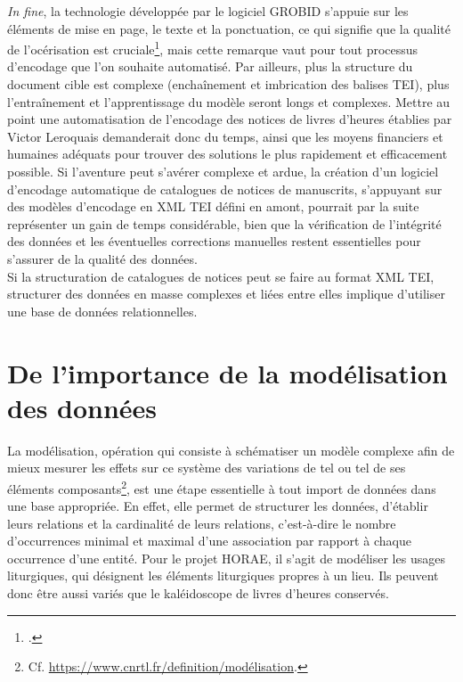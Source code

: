 \documentclass[a4paper,12pt,twoside]{book}
\begin{document}
	\textit{In fine}, la technologie développée par le logiciel GROBID s'appuie sur les éléments de mise en page, le texte et la ponctuation, ce qui signifie que la qualité de l'océrisation est cruciale\footcite[p. 59]{Grobid_catalogues}, mais cette remarque vaut pour tout processus d'encodage que l'on souhaite automatisé. Par ailleurs, plus la structure du document cible est complexe (enchaînement et imbrication des balises TEI), plus l'entraînement et l'apprentissage du modèle seront longs et complexes. Mettre au point une automatisation de l'encodage des notices de livres d'heures établies par Victor Leroquais demanderait donc du temps, ainsi que les moyens financiers et humaines adéquats pour trouver des solutions le plus rapidement et efficacement possible. Si l'aventure peut s'avérer complexe et ardue, la création d'un logiciel d'encodage automatique de catalogues de notices de manuscrits, s'appuyant sur des modèles d'encodage en XML TEI défini en amont, pourrait par la suite représenter un gain de temps considérable, bien que la vérification de l'intégrité des données et les éventuelles corrections manuelles restent essentielles pour s'assurer de la qualité des données. \\
	
	Si la structuration de catalogues de notices peut se faire au format XML TEI, structurer des données en masse complexes et liées entre elles implique d’utiliser une base de données relationnelles. 

	
	\chapter{\label{modelisation}De l’importance de la modélisation des données}
	
	La modélisation, opération qui consiste à schématiser un modèle complexe afin de mieux \og mesurer les effets sur ce système des variations de tel ou tel de ses éléments composants\fg{}\footnote{Cf. \url{https://www.cnrtl.fr/definition/modélisation}.}, est une étape essentielle à tout import de données dans une base appropriée. En effet, elle permet de structurer les données, d'établir leurs relations et la cardinalité de leurs relations, c'est-à-dire le nombre d'occurrences minimal et maximal d'une association par rapport à chaque occurrence d'une entité. Pour le projet HORAE, il s'agit de modéliser les usages liturgiques, qui désignent les éléments liturgiques propres à un lieu. Ils peuvent donc être aussi variés que le kaléidoscope de livres d'heures conservés.
\end{document}
